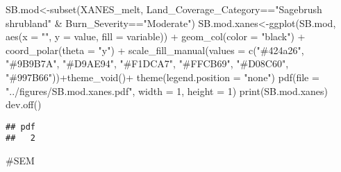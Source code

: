 \documentclass[
]{article}
\newenvironment{Shaded}{\begin{snugshade}}{\end{snugshade}}
\newcommand{\AttributeTok}[1]{\textcolor[rgb]{0.77,0.63,0.00}{#1}}
\newcommand{\DecValTok}[1]{\textcolor[rgb]{0.00,0.00,0.81}{#1}}
\newcommand{\FunctionTok}[1]{\textcolor[rgb]{0.00,0.00,0.00}{#1}}
\newcommand{\NormalTok}[1]{#1}
\newcommand{\OtherTok}[1]{\textcolor[rgb]{0.56,0.35,0.01}{#1}}
\newcommand{\SpecialCharTok}[1]{\textcolor[rgb]{0.00,0.00,0.00}{#1}}
\newcommand{\StringTok}[1]{\textcolor[rgb]{0.31,0.60,0.02}{#1}}
\begin{document}
\begin{Shaded}
\begin{Highlighting}[]
\NormalTok{SB.mod}\OtherTok{\textless{}{-}}\FunctionTok{subset}\NormalTok{(XANES\_melt, Land\_Coverage\_Category}\SpecialCharTok{==}\StringTok{"Sagebrush shrubland"} \SpecialCharTok{\&}\NormalTok{ Burn\_Severity}\SpecialCharTok{==}\StringTok{"Moderate"}\NormalTok{)}
\NormalTok{SB.mod.xanes}\OtherTok{\textless{}{-}}\FunctionTok{ggplot}\NormalTok{(SB.mod, }\FunctionTok{aes}\NormalTok{(}\AttributeTok{x =} \StringTok{""}\NormalTok{, }\AttributeTok{y =}\NormalTok{ value, }\AttributeTok{fill =}\NormalTok{ variable)) }\SpecialCharTok{+}
    \FunctionTok{geom\_col}\NormalTok{(}\AttributeTok{color =} \StringTok{"black"}\NormalTok{) }\SpecialCharTok{+}
    \FunctionTok{coord\_polar}\NormalTok{(}\AttributeTok{theta =} \StringTok{"y"}\NormalTok{) }\SpecialCharTok{+} \FunctionTok{scale\_fill\_manual}\NormalTok{(}\AttributeTok{values =} \FunctionTok{c}\NormalTok{(}\StringTok{"\#424a26"}\NormalTok{, }\StringTok{"\#9B9B7A"}\NormalTok{, }\StringTok{"\#D9AE94"}\NormalTok{, }\StringTok{"\#F1DCA7"}\NormalTok{, }\StringTok{"\#FFCB69"}\NormalTok{, }\StringTok{"\#D08C60"}\NormalTok{, }\StringTok{"\#997B66"}\NormalTok{))}\SpecialCharTok{+}\FunctionTok{theme\_void}\NormalTok{()}\SpecialCharTok{+}
    \FunctionTok{theme}\NormalTok{(}\AttributeTok{legend.position =} \StringTok{"none"}\NormalTok{)}
\FunctionTok{pdf}\NormalTok{(}\AttributeTok{file =} \StringTok{"../figures/SB.mod.xanes.pdf"}\NormalTok{, }\AttributeTok{width =} \DecValTok{1}\NormalTok{, }\AttributeTok{height =} \DecValTok{1}\NormalTok{) }
\FunctionTok{print}\NormalTok{(SB.mod.xanes)}
\FunctionTok{dev.off}\NormalTok{()}
\end{Highlighting}
\end{Shaded}

\begin{verbatim}
## pdf 
##   2
\end{verbatim}

\#SEM
\end{document}
